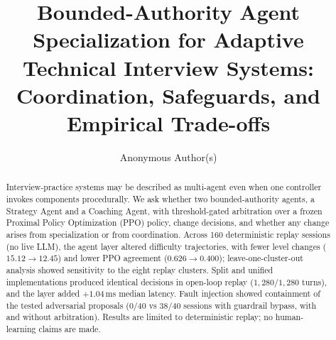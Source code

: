 \documentclass[runningheads,a4paper]{llncs}
\begin{document}
\title{Bounded-Authority Agent Specialization for Adaptive Technical Interview Systems: Coordination, Safeguards, and Empirical Trade-offs}
\author{Anonymous Author(s)}
\maketitle
\vspace{-1.2em}
\begin{abstract}
Interview-practice systems may be described as multi-agent even when one controller invokes components procedurally. We ask whether two bounded-authority agents, a Strategy Agent and a Coaching Agent, with threshold-gated arbitration over a frozen Proximal Policy Optimization (PPO) policy, change decisions, and whether any change arises from specialization or from coordination. Across 160 deterministic replay sessions (no live LLM), the agent layer altered difficulty trajectories, with fewer level changes ($15.12 \to 12.45$) and lower PPO agreement ($0.626 \to 0.400$); leave-one-cluster-out analysis showed sensitivity to the eight replay clusters. Split and unified implementations produced identical decisions in open-loop replay ($1{,}280/1{,}280$ turns), and the layer added $+1.04$\,ms median latency. Fault injection showed containment of the tested adversarial proposals ($0/40$ vs $38/40$ sessions with guardrail bypass, with and without arbitration). Results are limited to deterministic replay; no human-learning claims are made.
\end{abstract}










\let\oldthebibliography\thebibliography
\let\endoldthebibliography\endthebibliography
\renewenvironment{thebibliography}[1]{%
  \begin{oldthebibliography}{#1}%
    \setlength{\itemsep}{0pt}%
    \setlength{\parsep}{0pt}%
}{%
  \end{oldthebibliography}%
}

\enlargethispage{2\baselineskip}


\end{document}
